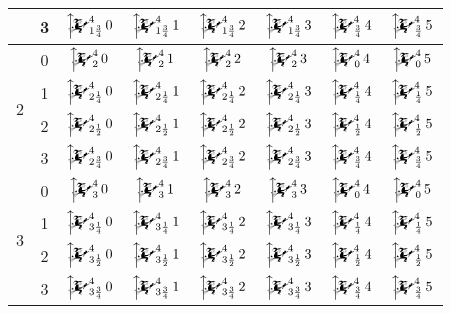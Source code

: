 \documentclass{article}
\newcommand{\mainfunext}[3]{\left\uparrow\!\!\!\mathwitch*_{#2}^{#1}#3\right.}
\begin{document}
\begin{table}[H]
\begin{tabular}{c|c|c|c|c|c|c|c|}
			                       &  3                        &    $\mainfunext4{1\frac34}0$  &    $\mainfunext4{1\frac34}1$  &    $\mainfunext4{1\frac34}2$  &    $\mainfunext4{1\frac34}3$  &    $\mainfunext4{\frac34}4$  &    $\mainfunext4{\frac34}5$  \\\hline\hline
			\multirow{4}{*}{2}     &  0                        &    $\mainfunext420$           &    $\mainfunext421$           &    $\mainfunext422$           &    $\mainfunext423$           &    $\mainfunext404$          &    $\mainfunext405$          \\\cline{2-8}
			                       &  1                        &    $\mainfunext4{2\frac14}0$  &    $\mainfunext4{2\frac14}1$  &    $\mainfunext4{2\frac14}2$  &    $\mainfunext4{2\frac14}3$  &    $\mainfunext4{\frac14}4$  &    $\mainfunext4{\frac14}5$  \\\cline{2-8}
			                       &  2                        &    $\mainfunext4{2\frac12}0$  &    $\mainfunext4{2\frac12}1$  &    $\mainfunext4{2\frac12}2$  &    $\mainfunext4{2\frac12}3$  &    $\mainfunext4{\frac12}4$  &    $\mainfunext4{\frac12}5$  \\\cline{2-8}
			                       &  3                        &    $\mainfunext4{2\frac34}0$  &    $\mainfunext4{2\frac34}1$  &    $\mainfunext4{2\frac34}2$  &    $\mainfunext4{2\frac34}3$  &    $\mainfunext4{\frac34}4$  &    $\mainfunext4{\frac34}5$  \\\hline\hline
			\multirow{4}{*}{3}     &  0                        &    $\mainfunext430$           &    $\mainfunext431$           &    $\mainfunext432$           &    $\mainfunext433$           &    $\mainfunext404$          &    $\mainfunext405$          \\\cline{2-8}
			                       &  1                        &    $\mainfunext4{3\frac14}0$  &    $\mainfunext4{3\frac14}1$  &    $\mainfunext4{3\frac14}2$  &    $\mainfunext4{3\frac14}3$  &    $\mainfunext4{\frac14}4$  &    $\mainfunext4{\frac14}5$  \\\cline{2-8}
			                       &  2                        &    $\mainfunext4{3\frac12}0$  &    $\mainfunext4{3\frac12}1$  &    $\mainfunext4{3\frac12}2$  &    $\mainfunext4{3\frac12}3$  &    $\mainfunext4{\frac12}4$  &    $\mainfunext4{\frac12}5$  \\\cline{2-8}
			                       &  3                        &    $\mainfunext4{3\frac34}0$  &    $\mainfunext4{3\frac34}1$  &    $\mainfunext4{3\frac34}2$  &    $\mainfunext4{3\frac34}3$  &    $\mainfunext4{\frac34}4$  &    $\mainfunext4{\frac34}5$  \\\hline
		\end{tabular}
	\end{table}
\end{document}
